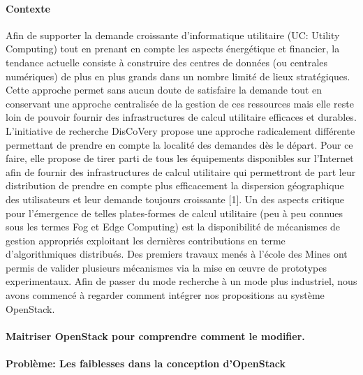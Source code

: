 \documentclass[a4paper,11pt]{article}
\newcommand{\discovery}{DisCoVery }
\begin{document}
\begin{note}
\paragraph*{Contexte\\}
Afin de supporter la demande croissante d'informatique utilitaire (UC:
Utility Computing) tout en prenant en compte les aspects énergétique
et financier, la tendance actuelle consiste à construire des centres
de données (ou centrales numériques) de plus en plus grands dans un
nombre limité de lieux stratégiques.  Cette approche permet sans aucun
doute de satisfaire la demande tout en conservant une approche
centralisée de la gestion de ces ressources mais elle reste loin de
pouvoir fournir des infrastructures de calcul utilitaire efficaces et
durables. L'initiative de recherche \discovery propose une approche
radicalement différente permettant de prendre en compte la localité
des demandes dès le départ. Pour ce faire, elle propose de tirer parti
de tous les équipements disponibles sur l'Internet afin de fournir des
infrastructures de calcul utilitaire qui permettront de part leur
distribution de prendre en compte plus efficacement la dispersion
géographique des utilisateurs et leur demande toujours croissante
[1]. Un des aspects critique pour l'émergence de telles plates-formes
de calcul utilitaire (peu à peu connues sous les termes Fog et Edge
Computing) est la disponibilité de mécanismes de gestion appropriés
exploitant les dernières contributions en terme d'algorithmiques
distribués.  Des premiers travaux menés à l'école des Mines ont permis
de valider plusieurs mécanismes via la mise en \oe uvre de prototypes
experimentaux. Afin de passer du mode recherche à un mode plus
industriel, nous avons commencé à regarder comment intégrer nos
propositions au système OpenStack.

\paragraph*{Maitriser OpenStack pour comprendre comment le modifier.\\}

\paragraph*{Problème: Les faiblesses dans la conception d'OpenStack\\}


\end{note}
\end{document}
